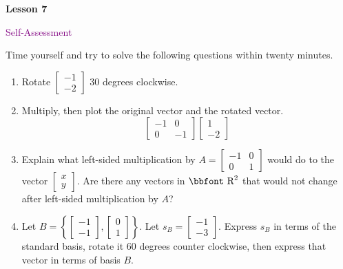 \documentclass[10pt]{book}
\theoremstyle{definition}
\theoremstyle{remark}
\newcommand{\bbR}{\mathbb{R}}
\def\bbR{\mbox{\bbfont R}}
\begin{document}
\newpage


\begin{tcolorbox}[
  width=\textwidth,
  colback=gray!10, %
  colframe=white, %
  boxrule=0pt,    %
  left=1cm,       %
  right=1cm,      %
  sharp corners  %
]

\begin{minipage}[t]{0.5\textwidth}
  \Huge \textbf{Lesson 7}
\end{minipage}%
\hfill
\begin{minipage}[t]{0.5\textwidth}
  \Huge\textcolor{purple}{Self-Assessment}
\end{minipage}
\end{tcolorbox}

\begin{large}
\noindent
Time yourself and try to solve the following questions within twenty minutes. 
\begin{enumerate}
\item Rotate $\begin{bmatrix}-1 \\ -2 \end{bmatrix}$ 30 degrees clockwise.\vfil
\item Multiply, then plot the original vector and the rotated vector.
$$\begin{bmatrix} -1 & 0 \\ 0 & -1 \end{bmatrix}\begin{bmatrix}1 \\ -2 \end{bmatrix}$$\vfil
\item Explain what left-sided multiplication by $A=\begin{bmatrix} -1 & 0 \\ 0 & 1 \end{bmatrix}$ would do to the vector $\begin{bmatrix}x \\ y \end{bmatrix}$. Are there any vectors in $\bbR^{2}$ that would not change after left-sided multiplication by $A$?
\item Let $B = \left\{\begin{bmatrix} -1 \\ -1 \end{bmatrix}, \begin{bmatrix}0 \\ 1 \end{bmatrix}\right \}$.  Let $s_B = \begin{bmatrix} -1 \\ -3 \end{bmatrix}$.  Express $s_B$ in terms of the standard basis, rotate it 60 degrees counter clockwise, then express that vector in terms of basis $B$.\vfil
\end{enumerate}


\end{large}
\end{document}
